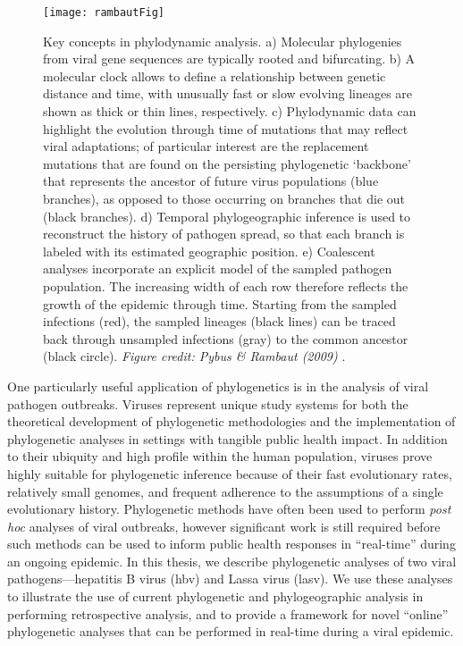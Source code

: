 \begin{figure}[ht]
  \centering
  \medskip
  \texttt{[image: rambautFig]}
  \caption[Applications of phylogenetic analysis]{Key concepts in phylodynamic analysis.
  a) Molecular phylogenies from viral gene sequences are typically rooted and bifurcating.
  b) A molecular clock allows to define a relationship between genetic distance and time, with unusually fast or slow evolving lineages are shown as thick or thin lines, respectively.
  c) Phylodynamic data can highlight the evolution through time of mutations that may reflect viral adaptations; of particular interest are the replacement mutations that are found on the persisting phylogenetic ‘backbone’ that represents the ancestor of future virus populations (blue branches), as opposed to those occurring on branches that die out (black branches).
  d) Temporal phylogeographic inference is used to reconstruct the history of pathogen spread, so that each branch is labeled with its estimated geographic position.
  e) Coalescent analyses incorporate an explicit model of the sampled pathogen population.
  The increasing width of each row therefore reflects the growth of the epidemic through time. Starting from the sampled infections (red), the sampled lineages (black lines) can be traced back through unsampled infections (gray) to the common ancestor (black circle).
  \textit{Figure credit: Pybus \& Rambaut (2009)} \cite{pybus2009evolutionary}.
  }
  \label{fig:phylogeneticsOverview}
\end{figure}

One particularly useful application of phylogenetics is in the analysis of viral pathogen outbreaks.
Viruses represent unique study systems for both the theoretical development of phylogenetic methodologies and the implementation of phylogenetic analyses in settings with tangible public health impact.
In addition to their ubiquity and high profile within the human population, viruses prove highly suitable for phylogenetic inference because of their fast evolutionary rates, relatively small genomes, and frequent adherence to the assumptions of a single evolutionary history.
Phylogenetic methods have often been used to perform \textit{post hoc} analyses of viral outbreaks, however significant work is still required before such methods can be used to inform public health responses in ``real-time'' during an ongoing epidemic.
In this thesis, we describe phylogenetic analyses of two viral pathogens---hepatitis B virus (\gls{hbv}) and Lassa virus (\gls{lasv}).
We use these analyses to illustrate the use of current phylogenetic and phylogeographic analysis in performing retrospective analysis, and to provide a framework for novel ``online'' phylogenetic analyses that can be performed in real-time during a viral epidemic.

